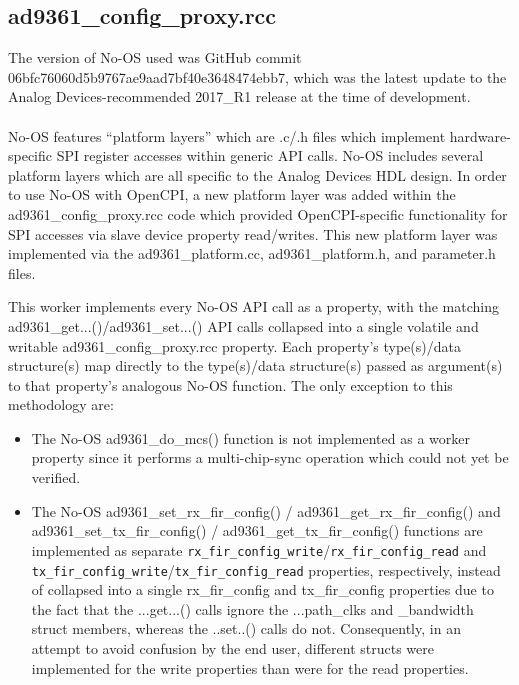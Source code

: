 \documentclass{article}
\def\comp{ad9361\_config\_proxy}
\begin{document}
\subsection*{\comp.rcc}
The version of No-OS used was GitHub commit 06bfc76060d5b9767ae9aad7bf40e3648474ebb7\cite{no_os_06bfc76060d5b9767ae9aad7bf40e3648474ebb7}, which was the latest update to the Analog Devices-recommended 2017\_R1 release at the time of development. \\ \\
No-OS features ``platform layers'' which are .c/.h files which implement hardware-specific SPI register accesses within generic API calls. No-OS includes several platform layers which are all specific to the Analog Devices HDL design\cite{adi_hdl_github}. In order to use No-OS with OpenCPI, a new platform layer was added within the \comp{}.rcc code which provided OpenCPI-specific functionality for SPI accesses via slave device property read/writes. This new platform layer was implemented via the ad9361\_platform.cc, ad9361\_platform.h, and parameter.h files. \\
\noindent \begin{sloppypar}
\noindent This worker implements every No-OS API call as a property, with the matching ad9361\_get...()/ad9361\_set...() API calls collapsed into a single volatile and writable \comp{}.rcc property. Each property's type(s)/data structure(s) map directly to the type(s)/data structure(s) passed as argument(s) to that property's analogous No-OS function. The only exception to this methodology are:
\begin{itemize}
	\item The No-OS ad9361\_do\_mcs() function is not implemented as a worker property since it performs a multi-chip-sync operation which could not yet be verified.
	\item The No-OS ad9361\_set\_rx\_fir\_config() / ad9361\_get\_rx\_fir\_config() and ad9361\_set\_tx\_fir\_config() / ad9361\_get\_tx\_fir\_config() functions are implemented as separate \verb+rx_fir_config_write+/\verb+rx_fir_config_read+ and \verb+tx_fir_config_write+/\verb+tx_fir_config_read+ properties, respectively, instead of collapsed into a single rx\_fir\_config and tx\_fir\_config properties due to the fact that the ...get...() calls ignore the ...path\_clks and \_bandwidth struct members, whereas the ..set..() calls do not. Consequently, in an attempt to avoid confusion by the end user, different structs were implemented for the write properties than were for the read properties.
\end{itemize}
\end{sloppypar}
\end{document}
